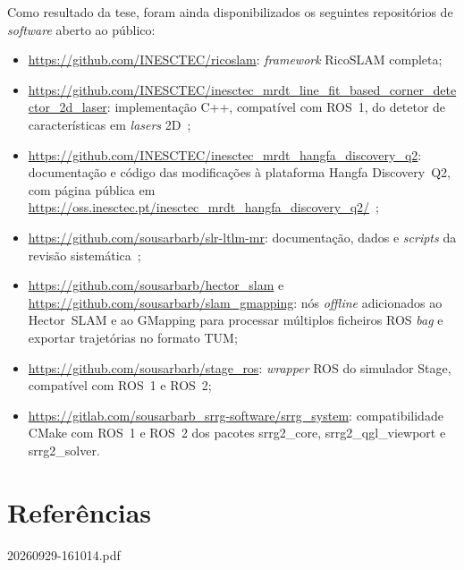 \documentclass[11pt,a4paper,oneside]{article}
\begin{document}
Como resultado da tese, foram ainda disponibilizados os seguintes repositórios
de \textit{software} aberto ao público:
\begin{itemize}
\item \url{https://github.com/INESCTEC/ricoslam}: \textit{framework} RicoSLAM
      completa;
\item \url{https://github.com/INESCTEC/inesctec_mrdt_line_fit_based_corner_detector_2d_laser}:
      implementação C++, compatível com ROS~1, do detetor de características
      em \textit{lasers} 2D~\cite{sousa:icara:2024};
\item \url{https://github.com/INESCTEC/inesctec_mrdt_hangfa_discovery_q2}:
      documentação e código das modificações à plataforma Hangfa Discovery~Q2,
      com página pública em \url{https://oss.inesctec.pt/inesctec_mrdt_hangfa_discovery_q2/}~\cite{sousa:icarsc:2025};
\item \url{https://github.com/sousarbarb/slr-ltlm-mr}: documentação, dados e
      \textit{scripts} da revisão sistemática~\cite{sousa:jfr:2023};
\item \url{https://github.com/sousarbarb/hector_slam} e
      \url{https://github.com/sousarbarb/slam_gmapping}: nós \textit{offline}
      adicionados ao Hector~SLAM e ao GMapping para processar múltiplos
      ficheiros ROS \textit{bag} e exportar trajetórias no formato TUM;
\item \url{https://github.com/sousarbarb/stage_ros}: \textit{wrapper} ROS do
      simulador Stage, compatível com ROS~1 e ROS~2;
\item \url{https://gitlab.com/sousarbarb_srrg-software/srrg_system}:
      compatibilidade CMake com ROS~1 e ROS~2 dos pacotes srrg2\_core,
      srrg2\_qgl\_viewport e srrg2\_solver.
\end{itemize}

\section*{Referências}

\begin{refcontext}[labelprefix=C]
\printbibliography[keyword=core,heading=subbib,title={Contributos da tese}]
\end{refcontext}

\begin{refcontext}[labelprefix=P]
\printbibliography[keyword=other,heading=subbib,title={Outras publicações no período do doutoramento}]
\end{refcontext}

\clearpage
\appendix
%
           {20260929-161014.pdf}

\end{document}
